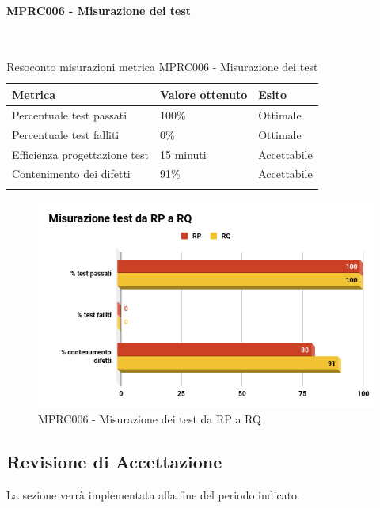 \paragraph{MPRC006 - Misurazione dei test}\mbox{}\\[0.4cm]
\begin{center}
	\centering
	\renewcommand{\arraystretch}{1.5}
	\begin{longtable}{  p{5cm}  p{5cm} p{3cm}  }
		\rowcolor{tableHeadYellow}
		\textbf{Metrica}   & \textbf{Valore ottenuto} & \textbf{Esito} \\ 
		\endhead
		Percentuale test passati     & 100\%  & Ottimale \\
		Percentuale test falliti     & 0\% & Ottimale \\
		Efficienza progettazione test    & 15 minuti & Accettabile \\
		Contenimento dei difetti    & 91\% & Accettabile \\
		\rowcolor{white}
		\caption{Resoconto misurazioni metrica MPRC006 - Misurazione dei test}
	\end{longtable}
\end{center}
\begin{figure}[H]
	\centering
	\includegraphics[width=13cm,keepaspectratio]{../includes/pics/Misurazione.png}
	\caption{\label{fig:mission}MPRC006 - Misurazione dei test da RP a RQ}
\end{figure}

\subsection{Revisione di Accettazione}
\label{sec:revisione_accettazione}
La sezione verrà implementata alla fine del periodo indicato.
